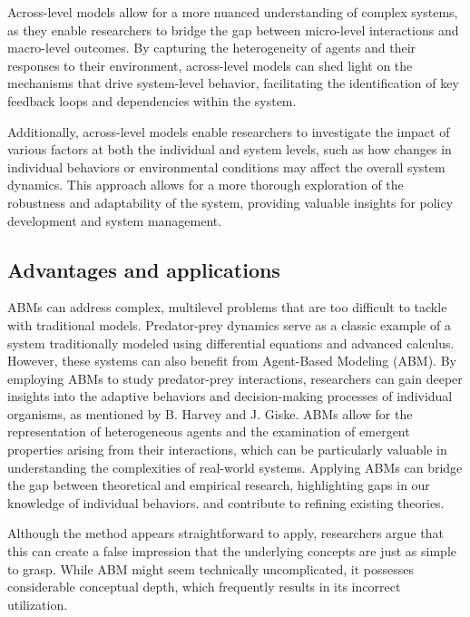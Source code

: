     Across-level models allow for a more nuanced understanding of complex systems, as they enable researchers to bridge the gap between micro-level interactions and macro-level outcomes. By capturing the heterogeneity of agents and their responses to their environment, across-level models can shed light on the mechanisms that drive system-level behavior, facilitating the identification of key feedback loops and dependencies within the system.

    Additionally, across-level models enable researchers to investigate the impact of various factors at both the individual and system levels, such as how changes in individual behaviors or environmental conditions may affect the overall system dynamics. This approach allows for a more thorough exploration of the robustness and adaptability of the system, providing valuable insights for policy development and system management.

\subsection{Advantages and applications}
    ABMs can address complex, multilevel problems that are too difficult to tackle with traditional models. Predator-prey dynamics serve as a classic example of a system traditionally modeled using differential equations and advanced calculus. However, these systems can also benefit from Agent-Based Modeling (ABM). By employing ABMs to study predator-prey interactions, researchers can gain deeper insights into the adaptive behaviors and decision-making processes of individual organisms, as mentioned by B. Harvey and J. Giske. ABMs allow for the representation of heterogeneous agents and the examination of emergent properties arising from their interactions, which can be particularly valuable in understanding the complexities of real-world systems. Applying ABMs can bridge the gap between theoretical and empirical research, highlighting gaps in our knowledge of individual behaviors. and contribute to refining existing theories.

    Although the method appears straightforward to apply, researchers argue that this can create a false impression that the underlying concepts are just as simple to grasp. While ABM might seem technically uncomplicated, it possesses considerable conceptual depth, which frequently results in its incorrect utilization.
